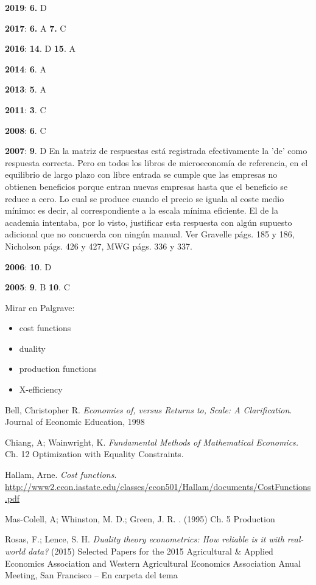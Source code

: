 \documentclass{nuevotema}
\begin{document}
\notas

\textbf{2019}: \textbf{6.} D

\textbf{2017}: \textbf{6.} A \textbf{7.} C

\textbf{2016}: \textbf{14}. D \textbf{15}. A

\textbf{2014}: \textbf{6}. A

\textbf{2013}: \textbf{5}. A

\textbf{2011}: \textbf{3}. C

\textbf{2008}: \textbf{6}. C

\textbf{2007}: \textbf{9}. D En la matriz de respuestas está registrada efectivamente la 'de' como respuesta correcta. Pero en todos los libros de microeconomía de referencia, en el equilibrio de largo plazo con libre entrada se cumple que las empresas no obtienen beneficios porque entran nuevas empresas hasta que el beneficio se reduce a cero. Lo cual se produce cuando el precio se iguala al coste medio mínimo: es decir, al correspondiente a la escala mínima eficiente. El de la academia intentaba, por lo visto, justificar esta respuesta con algún supuesto adicional que no concuerda con ningún manual. Ver Gravelle págs. 185 y 186, Nicholson págs. 426 y 427, MWG págs. 336 y 337.

\textbf{2006}: \textbf{10}. D

\textbf{2005}: \textbf{9}. B \textbf{10}. C


\bibliografia

Mirar en Palgrave:
\begin{itemize}
	\item cost functions
	\item duality
	\item production functions
	\item X-efficiency
\end{itemize}


Bell, Christopher R. \textit{Economies of, versus Returns to, Scale: A Clarification}. Journal of Economic Education, 1998

Chiang, A; Wainwright, K. \textit{Fundamental Methods of Mathematical Economics.} Ch. 12 Optimization with Equality Constraints.

Hallam, Arne. \textit{Cost functions}. \url{http://www2.econ.iastate.edu/classes/econ501/Hallam/documents/CostFunctions.pdf}

Mas-Colell, A; Whinston, M. D.; Green, J. R. . (1995) Ch. 5 Production

Rosas, F.; Lence, S. H. \textit{Duality theory econometrics: How reliable is it with real-world data?} (2015) Selected Papers for the 2015 Agricultural \& Applied Economics Association and Western Agricultural Economics Association Anual Meeting, San Francisco -- En carpeta del tema
\end{document}
